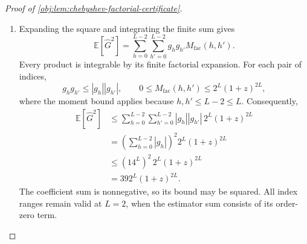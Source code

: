 \begin{proof}[Proof of \cref{obj:lem:chebyshev-factorial-certificate}]
\begin{enumerate}
Also, for every overlap index in the displayed sum,
\[
z^{h+h'-j_{\mathrm{ov}}}
 \le(1+z)^{h+h'-j_{\mathrm{ov}}}
 \le(1+z)^{2L},
\]
because \(z\ge0\), \(1+z\ge1\), and \(h+h'-j_{\mathrm{ov}}\le2L\). These inequalities include \(z=0\) under the stated power convention. Hence
\[
\begin{aligned}
M_{\mathrm{fac}}(h,h')
 &\le\sum_{j_{\mathrm{ov}}=0}^{\min(h,h')}
       \binom{h}{j_{\mathrm{ov}}}(1+z)^{2L}\\
 &\le\sum_{j_{\mathrm{ov}}=0}^{h}
       \binom{h}{j_{\mathrm{ov}}}(1+z)^{2L}\\
 &=2^h(1+z)^{2L}\\
 &\le2^L(1+z)^{2L}.
\end{aligned}
\]
The second inequality adds nonnegative terms, and the equality is the binomial theorem.

\item Expanding the square and integrating the finite sum gives
\[
\mathbb E[\widehat G^2]
 =\sum_{h=0}^{L-2}\sum_{h'=0}^{L-2}
   g_hg_{h'}M_{\mathrm{fac}}(h,h').
\]
Every product is integrable by its finite factorial expansion. For each pair of indices,
\[
g_hg_{h'}\le|g_h||g_{h'}|,
\qquad
0\le M_{\mathrm{fac}}(h,h')
 \le2^L(1+z)^{2L},
\]
where the moment bound applies because \(h,h'\le L-2\le L\). Consequently,
\[
\begin{aligned}
\mathbb E[\widehat G^2]
 &\le\sum_{h=0}^{L-2}\sum_{h'=0}^{L-2}
       |g_h||g_{h'}|\,2^L(1+z)^{2L}\\
 &=\left(\sum_{h=0}^{L-2}|g_h|\right)^2
      2^L(1+z)^{2L}\\
 &\le(14^L)^2\,2^L(1+z)^{2L}\\
 &=392^L(1+z)^{2L}.
\end{aligned}
\]
The coefficient sum is nonnegative, so its bound may be squared. All index ranges remain valid at \(L=2\), when the estimator sum consists of its order-zero term.
\end{enumerate}
\end{proof}
